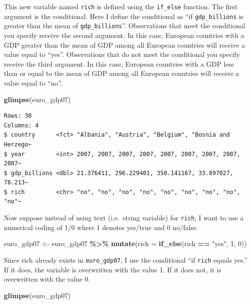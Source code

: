 \documentclass[
]{book}
\makeatletter
\newenvironment{Shaded}{\begin{snugshade}}{\end{snugshade}}
\newcommand{\AttributeTok}[1]{\textcolor[rgb]{0.27,0.27,0.27}{#1}}
\newcommand{\DecValTok}[1]{\textcolor[rgb]{0.06,0.06,0.06}{#1}}
\newcommand{\FunctionTok}[1]{\textcolor[rgb]{0.27,0.27,0.27}{\textbf{#1}}}
\newcommand{\NormalTok}[1]{#1}
\newcommand{\OtherTok}[1]{\textcolor[rgb]{0.37,0.37,0.37}{#1}}
\newcommand{\SpecialCharTok}[1]{\textcolor[rgb]{0.43,0.43,0.43}{\textbf{#1}}}
\newcommand{\StringTok}[1]{\textcolor[rgb]{0.5,0.5,0.5}{#1}}
\newenvironment{kframe}{%
\medskip{}
\setlength{\fboxsep}{.8em}
 \def\at@end@of@kframe{}%
 \ifinner\ifhmode%
  \def\at@end@of@kframe{\end{minipage}}%
  \begin{minipage}{\columnwidth}%
 \fi\fi%
 \def\FrameCommand##1{\hskip\@totalleftmargin \hskip-\fboxsep
 \colorbox{shadecolor}{##1}\hskip-\fboxsep
     \hskip-\linewidth \hskip-\@totalleftmargin \hskip\columnwidth}%
 \MakeFramed {\advance\hsize-\width
   \@totalleftmargin\z@ \linewidth\hsize
   \@setminipage}}%
 {\par\unskip\endMakeFramed%
 \at@end@of@kframe}
\renewenvironment{Shaded}{\begin{kframe}}{\end{kframe}}
\makeatother
\begin{document}
This new variable named \texttt{rich} is defined using the \texttt{if\_else} function. The first argument is the conditional. Here I define the conditional as ``if \texttt{gdp\_billions} is greater than the mean of \texttt{gdp\_billions}''. Observations that meet the conditional you specify receive the second argument. In this case, European countries with a GDP greater than the mean of GDP among all European countries will receive a value equal to ``yes''. Observations that do not meet the conditional you specify receive the third argument. In this case, European countries with a GDP less than or equal to the mean of GDP among all European countries will receive a value equal to ``no''.

\begin{Shaded}
\begin{Highlighting}[]
\FunctionTok{glimpse}\NormalTok{(euro\_gdp07)}
\end{Highlighting}
\end{Shaded}

\begin{verbatim}
Rows: 30
Columns: 4
$ country      <fct> "Albania", "Austria", "Belgium", "Bosnia and Herzego~
$ year         <int> 2007, 2007, 2007, 2007, 2007, 2007, 2007, 2007, 2007~
$ gdp_billions <dbl> 21.376411, 296.229401, 350.141167, 33.897027, 78.213~
$ rich         <chr> "no", "no", "no", "no", "no", "no", "no", "no", "no"~
\end{verbatim}

Now suppose instead of using text (i.e.~string variable) for \texttt{rich}, I want to use a numerical coding of 1/0 where 1 denotes yes/true and 0 no/false.

\begin{Shaded}
\begin{Highlighting}[]
\NormalTok{euro\_gdp07 }\OtherTok{\textless{}{-}}\NormalTok{ euro\_gdp07 }\SpecialCharTok{\%\textgreater{}\%} 
  \FunctionTok{mutate}\NormalTok{(}\AttributeTok{rich =} \FunctionTok{if\_else}\NormalTok{(rich }\SpecialCharTok{==} \StringTok{"yes"}\NormalTok{, }\DecValTok{1}\NormalTok{, }\DecValTok{0}\NormalTok{))}
\end{Highlighting}
\end{Shaded}

Since rich already exists in \texttt{euro\_gdp07}, I use the conditional ``if \texttt{rich} equals yes.'' If it does, the variable is overwritten with the value 1. If it does not, it is overwritten with the value 0.

\begin{Shaded}
\begin{Highlighting}[]
\FunctionTok{glimpse}\NormalTok{(euro\_gdp07)}
\end{Highlighting}
\end{Shaded}
\end{document}
